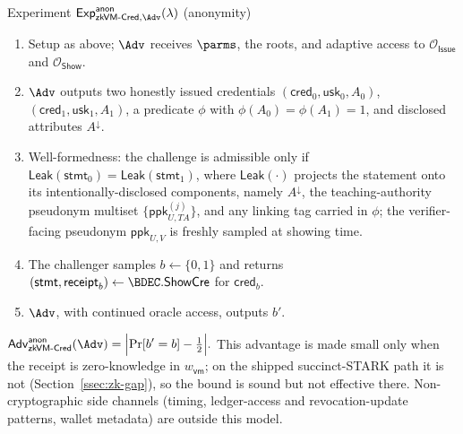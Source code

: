\begin{gamebox}{Experiment $\mathsf{Exp}^{\mathsf{anon}}_{\mathsf{zkVM\text{-}Cred},\Adv}(\lambda)$ (anonymity)}
\begin{enumerate}
\item Setup as above; $\Adv$ receives $\parms$, the roots, and adaptive access to
$\mathcal O_{\mathsf{Issue}}$ and $\mathcal O_{\mathsf{Show}}$.
\item $\Adv$ outputs two honestly issued credentials
$(\mathsf{cred}_0,\mathsf{usk}_0,A_0)$, $(\mathsf{cred}_1,\mathsf{usk}_1,A_1)$, a predicate $\phi$ with
$\phi(A_0)=\phi(A_1)=1$, and disclosed attributes $A^\downarrow$.
\item Well-formedness: the challenge is admissible only if
$\mathsf{Leak}(\mathsf{stmt}_0)=\mathsf{Leak}(\mathsf{stmt}_1)$, where $\mathsf{Leak}(\cdot)$ projects the
statement onto its intentionally-disclosed components, namely $A^\downarrow$, the teaching-authority
pseudonym multiset $\{\mathsf{ppk}_{U,TA}^{(j)}\}$, and any linking tag carried in $\phi$; the
verifier-facing pseudonym $\mathsf{ppk}_{U,V}$ is freshly sampled at showing time.
\item The challenger samples $b\leftarrow\{0,1\}$ and returns
$(\mathsf{stmt},\mathsf{receipt}_b)\leftarrow\BDEC.\mathsf{ShowCre}$ for $\mathsf{cred}_b$.
\item $\Adv$, with continued oracle access, outputs $b'$.
\end{enumerate}
$\displaystyle
\mathsf{Adv}^{\mathsf{anon}}_{\mathsf{zkVM\text{-}Cred}}(\Adv)
=\Bigl|\Pr[b'=b]-\tfrac12\Bigr|.$
This advantage is made small only when the receipt is zero-knowledge in $w_{\mathsf{vm}}$; on the
shipped succinct-STARK path it is not (Section~\ref{ssec:zk-gap}), so the bound is sound but not
effective there. Non-cryptographic side channels (timing, ledger-access and revocation-update
patterns, wallet metadata) are outside this model.
\end{gamebox}

